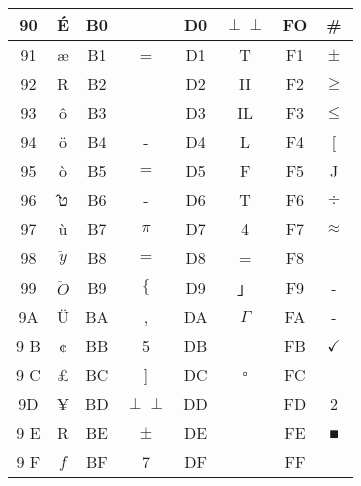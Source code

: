 \documentclass[10pt]{article}
\def\Perp{\perp\!\!\!\perp}
\begin{document}
\begin{center}
\begin{tabular}{|c|c|c|c|c|c|c|c|}
\hline
90 & É & B0 &  & D0 & $\Perp$ & FO & \# \\
\hline
91 & æ & B1 & = & D1 & T & F1 & $\pm$ \\
\hline
92 & R & B2 &  & D2 & II & F2 & $\geq$ \\
\hline
93 & ô & B3 &  & D3 & IL & F3 & $\leq$ \\
\hline
94 & ö & B4 & - & D4 & L & F4 & [ \\
\hline
95 & ò & B5 & $=$ & D5 & F & F5 & J \\
\hline
96 & ט̂ & B6 & - & D6 & T & F6 & $\div$ \\
\hline
97 & ù & B7 & $\pi$ & D7 & 4 & F7 & $\approx$ \\
\hline
98 & $\ddot{y}$ & B8 & $=$ & D8 & = & F8 &  \\
\hline
99 & $\ddot{O}$ & B9 & $\{$ & D9 & 」 & F9 & - \\
\hline
9A & Ü & BA & , & DA & $\Gamma$ & FA & - \\
\hline
9 B & ¢ & BB & 5 & DB &  & FB & $\checkmark$ \\
\hline
9 C & £ & BC & ] & DC & $\square$ & FC &  \\
\hline
9D & ¥ & BD & $\Perp$ & DD &  & FD & 2 \\
\hline
9 E & R & BE & $\pm$ & DE &  & FE & ■ \\
\hline
9 F & $f$ & BF & 7 & DF &  & FF &  \\
\hline
\end{tabular}
\end{center}
\end{document}
